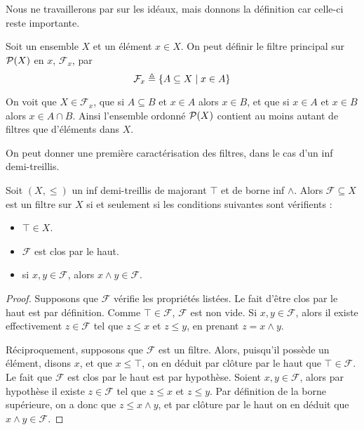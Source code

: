 Nous ne travaillerons par sur les idéaux, mais donnons la définition car celle-ci
reste importante.

\begin{example}
  Soit un ensemble $X$ et un élément $x\in X$. On peut définir le filtre
  principal sur $\mathcal{P}(X)$ en $x$, $\mathcal F_x$, par
  \[\mathcal F_x \triangleq \{A\subseteq X\mid x \in A\}\]

  On voit que $X\in \mathcal F_x$, que si $A\subseteq B$ et $x\in A$ alors
  $x\in B$, et que si $x\in A$ et $x\in B$ alors $x\in A\cap B$. Ainsi l'ensemble
  ordonné $\mathcal{P}(X)$ contient au moins autant de filtres que d'éléments dans
  $X$.
\end{example}

On peut donner une première caractérisation des filtres, dans le cas d'un
inf demi-treillis.

\begin{property}
  Soit $(X,\leq)$ un inf demi-treillis de majorant $\top$ et de borne inf
  $\land$. Alors $\mathcal F\subseteq X$ est un filtre sur $X$ si et seulement si
  les conditions suivantes sont vérifients :
  \begin{itemize}
  \item $\top \in X$.
  \item $\mathcal F$ est clos par le haut.
  \item si $x,y\in \mathcal F$, alors $x\land y\in \mathcal F$.
  \end{itemize}
\end{property}

\begin{proof}
  Supposons que $\mathcal F$ vérifie les propriétés listées. Le fait d'être
  clos par le haut est par définition. Comme $\top\in\mathcal F$,
  $\mathcal F$ est non vide. Si $x,y\in\mathcal F$, alors il existe effectivement
  $z\in \mathcal F$ tel que $z\leq x$ et $z\leq y$, en prenant $z = x\land y$.

  Réciproquement, supposons que $\mathcal F$ est un filtre. Alors, puisqu'il
  possède un élément, disons $x$, et que $x\leq \top$, on en déduit par clôture
  par le haut que $\top\in\mathcal F$. Le fait que $\mathcal F$ est clos par le
  haut est par hypothèse. Soient $x,y\in \mathcal F$, alors par hypothèse il
  existe $z\in \mathcal F$ tel que $z\leq x$ et $z\leq y$. Par définition de la
  borne supérieure, on a donc que $z\leq x\land y$, et par clôture par le haut
  on en déduit que $x\land y \in \mathcal F$.
\end{proof}

